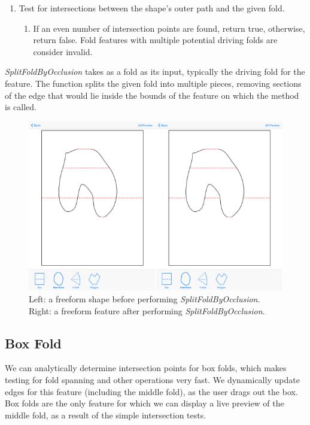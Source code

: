 \begin{enumerate}
\def\labelenumi{\arabic{enumi})}
\itemsep1pt\parskip0pt
\item
  Test for intersections between the shape's outer path and the given
  fold.

  \begin{enumerate}
  \def\labelenumii{(\alph{enumii})}
  \itemsep1pt\parskip0pt
  \item
    If an even number of intersection points are found, return true,
    otherwise, return false. Fold features with multiple potential
    driving folds are consider invalid.
  \end{enumerate}
\end{enumerate}

\emph{SplitFoldByOcclusion} takes as a fold as its input, typically the
driving fold for the feature. The function splits the given fold into
multiple pieces, removing sections of the edge that would lie inside the
bounds of the feature on which the method is called.

\begin{figure}[htbp]
\centering
\includegraphics{figures/41_Tech_Tool_Implementation/splitfoldbyOcclusionBeforeAfter.pdf}
\caption{Left: a freeform shape before performing
\emph{SplitFoldByOcclusion}. Right: a freeform feature after performing
\emph{SplitFoldByOcclusion}.}
\end{figure}

\subsection{Box Fold}\label{box-fold}

We can analytically determine intersection points for box folds, which
makes testing for fold spanning and other operations very fast. We
dynamically update edges for this feature (including the middle fold),
as the user drags out the box. Box folds are the only feature for which
we can display a live preview of the middle fold, as a result of the
simple intersection tests.

